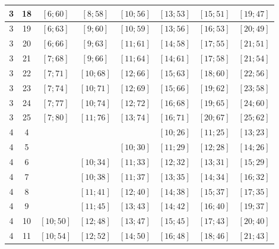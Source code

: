 \documentclass[a4paper,12pt]{article}
\begin{document}
\begin{center}
{\begin{longtable}[H]{|c|c|c|c|c|c|c|c|}
3 &  18 &  $\left[ 6; 60\right]$ &  $\left[ 8; 58\right]$ &  $\left[ 10; 56\right]$ &  $\left[ 13; 53\right]$ &  $\left[ 15; 51\right]$ &  $\left[ 19; 47\right]$ \tabularnewline \hline
3 &  19 &  $\left[ 6; 63\right]$ &  $\left[ 9; 60\right]$ &  $\left[ 10; 59\right]$ &  $\left[ 13; 56\right]$ &  $\left[ 16; 53\right]$ &  $\left[ 20; 49\right]$ \tabularnewline \hline
3 &  20 &  $\left[ 6; 66\right]$ &  $\left[ 9; 63\right]$ &  $\left[ 11; 61\right]$ &  $\left[ 14; 58\right]$ &  $\left[ 17; 55\right]$ &  $\left[ 21; 51\right]$ \tabularnewline \hline
3 &  21 &  $\left[ 7; 68\right]$ &  $\left[ 9; 66\right]$ &  $\left[ 11; 64\right]$ &  $\left[ 14; 61\right]$ &  $\left[ 17; 58\right]$ &  $\left[ 21; 54\right]$ \tabularnewline \hline
3 &  22 &  $\left[ 7; 71\right]$ &  $\left[ 10; 68\right]$ &  $\left[ 12; 66\right]$ &  $\left[ 15; 63\right]$ &  $\left[ 18; 60\right]$ &  $\left[ 22; 56\right]$ \tabularnewline \hline
3 &  23 &  $\left[ 7; 74\right]$ &  $\left[ 10; 71\right]$ &  $\left[ 12; 69\right]$ &  $\left[ 15; 66\right]$ &  $\left[ 19; 62\right]$ &  $\left[ 23; 58\right]$ \tabularnewline \hline
3 &  24 &  $\left[ 7; 77\right]$ &  $\left[ 10; 74\right]$ &  $\left[ 12; 72\right]$ &  $\left[ 16; 68\right]$ &  $\left[ 19; 65\right]$ &  $\left[ 24; 60\right]$ \tabularnewline \hline
3 &  25 &  $\left[ 7; 80\right]$ &  $\left[ 11; 76\right]$ &  $\left[ 13; 74\right]$ &  $\left[ 16; 71\right]$ &  $\left[ 20; 67\right]$ &  $\left[ 25; 62\right]$ \tabularnewline \hline
4 &  4 &   &   &   &  $\left[ 10; 26\right]$ &  $\left[ 11; 25\right]$ &  $\left[ 13; 23\right]$ \tabularnewline \hline
4 &  5 &   &   &  $\left[ 10; 30\right]$ &  $\left[ 11; 29\right]$ &  $\left[ 12; 28\right]$ &  $\left[ 14; 26\right]$ \tabularnewline \hline
4 &  6 &   &  $\left[ 10; 34\right]$ &  $\left[ 11; 33\right]$ &  $\left[ 12; 32\right]$ &  $\left[ 13; 31\right]$ &  $\left[ 15; 29\right]$ \tabularnewline \hline
4 &  7 &   &  $\left[ 10; 38\right]$ &  $\left[ 11; 37\right]$ &  $\left[ 13; 35\right]$ &  $\left[ 14; 34\right]$ &  $\left[ 16; 32\right]$ \tabularnewline \hline
4 &  8 &   &  $\left[ 11; 41\right]$ &  $\left[ 12; 40\right]$ &  $\left[ 14; 38\right]$ &  $\left[ 15; 37\right]$ &  $\left[ 17; 35\right]$ \tabularnewline \hline
4 &  9 &   &  $\left[ 11; 45\right]$ &  $\left[ 13; 43\right]$ &  $\left[ 14; 42\right]$ &  $\left[ 16; 40\right]$ &  $\left[ 19; 37\right]$ \tabularnewline \hline
4 &  10 &  $\left[ 10; 50\right]$ &  $\left[ 12; 48\right]$ &  $\left[ 13; 47\right]$ &  $\left[ 15; 45\right]$ &  $\left[ 17; 43\right]$ &  $\left[ 20; 40\right]$ \tabularnewline \hline
4 &  11 &  $\left[ 10; 54\right]$ &  $\left[ 12; 52\right]$ &  $\left[ 14; 50\right]$ &  $\left[ 16; 48\right]$ &  $\left[ 18; 46\right]$ &  $\left[ 21; 43\right]$ \tabularnewline \hline

\end{longtable}}
\end{center}
\end{document}
